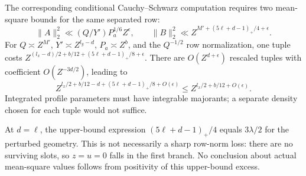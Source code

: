 \documentclass[12pt]{article}
\begin{document}
The corresponding conditional Cauchy--Schwarz computation requires
two mean-square bounds for the same separated row:
\[
 \|A\|_2^2\ll(Q/Y')P_a^{1/6}Z^\epsilon,\qquad
 \|B\|_2^2\ll Z^{M'+(5\ell+d-1)_+/4+\epsilon}.
\]
For \(Q\asymp Z^{M'}\), \(Y'\asymp Z^{l_y-d}\),
\(P_a\asymp Z^b\), and the \(Q^{-1/2}\) row normalization,
one tuple costs
\(Z^{(l_x-d)/2+b/12+(5\ell+d-1)_+/8+\epsilon}\).
There are \(O(Z^{d+\epsilon})\) rescaled tuples with coefficient
\(O(Z^{-3d/2})\), leading to
\[
 Z^{l_x/2+b/12-d+(5\ell+d-1)_+/8+O(\epsilon)}
   \le Z^{l_x/2+b/12+O(\epsilon)}.
\]
Integrated profile parameters must have integrable majorants; a
separate density chosen for each tuple would not suffice.

At \(d=\ell\), the upper-bound expression
\((5\ell+d-1)_+/4\) equals \(3\lambda/2\) for the perturbed
geometry.  This is not necessarily a sharp row-norm loss:
there are no surviving slots, so \(z=u=0\) falls in the first
branch.  No conclusion about actual mean-square values follows
from positivity of this upper-bound excess.
\end{document}
